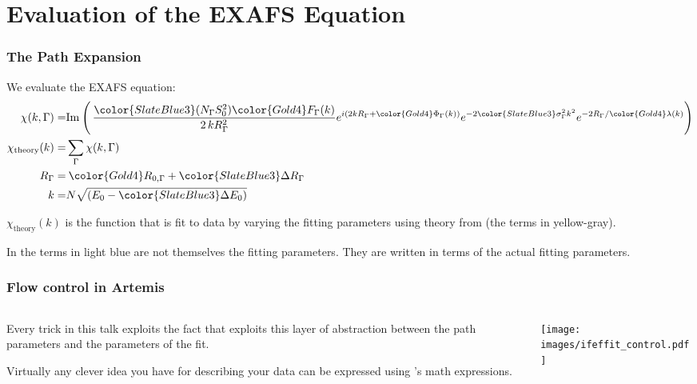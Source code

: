\documentclass[10pt, xcolor=x11names, compress]{beamer}
\newcommand{\TheBigLesson}{%
  \begin{alertblock}{}
    In {\artemis} the {\color{SlateBlue3}terms in light blue} are not
    themselves the fitting parameters.  They are \alert{written in
      terms of} the actual fitting parameters.
  \end{alertblock}
}
\begin{document}
\section[Algorithm]{Evaluation of the EXAFS Equation}
\begin{frame}
  \frametitle{The Path Expansion}

  We evaluate the EXAFS equation:
  {\small
    \begin{align}
      \chi(k,\Gamma) =& {\Im}\>\Biggl(\, %
      { \frac{{\color{SlateBlue3}(N_\Gamma S_0^2)}{\color{Gold4}F_\Gamma(k)}}
        {2\,kR_\Gamma^2} }
      e^{i(2kR_\Gamma + {\color{Gold4}\Phi_\Gamma(k)})}
      e^{-2{\color{SlateBlue3}\sigma_\Gamma^2}k^2}
      e^{-2R_\Gamma/{\color{Gold4}\lambda(k)}}
      \Biggl) \\
      \chi_{\mathrm{theory}}(k) =& \sum\limits_{\Gamma}\chi(k,\Gamma) \notag\\
      R_\Gamma =& \> {\color{Gold4}R_{0,\Gamma}} +
      {\color{SlateBlue3}\Delta R_\Gamma} \\
      k =& N\sqrt{(E_0 - {\color{SlateBlue3}\Delta E_0})}
    \end{align}}

  \medskip

  $\chi_{\mathrm{theory}}(k)$ is the function that is fit to data by
  varying the fitting parameters using theory from {\feff} (the
  {\color{Gold4}terms in yellow-gray}).

  \bigskip

  \TheBigLesson
\end{frame}

\begin{frame}
  \frametitle{Flow control in Artemis}

  \begin{columns}
    \begin{column}{0.5\linewidth}
      Every trick in this talk exploits the fact that {\artemis}
      exploits this layer of abstraction between the
      {\color{SlateBlue3}path parameters} and the
      {\color{Green4}parameters of the fit}.

      \bigskip

      \begin{exampleblock}{}
        Virtually any clever idea you have for describing your data
        can be expressed using {\artemis}'s math expressions.
      \end{exampleblock}
    \end{column}
    \begin{column}{0.5\linewidth}
      \texttt{[image: images/ifeffit\_control.pdf]}      
    \end{column}
  \end{columns}
\end{frame}
\end{document}
